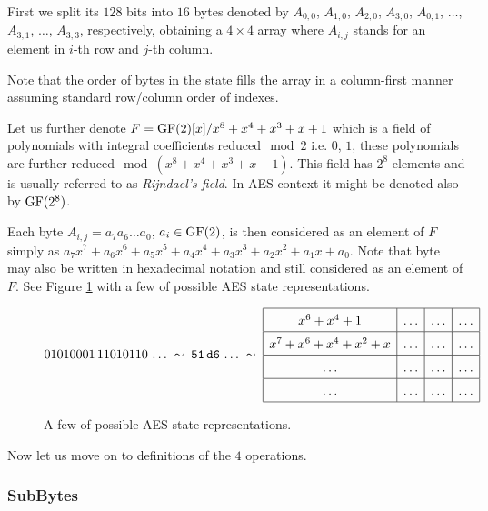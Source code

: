 First we split its $128$ bits into $16$ bytes denoted by $A_{0,0}$, $A_{1,0}$, $A_{2,0}$, $A_{3,0}$, $A_{0,1}$, $\ldots$, $A_{3,1}$, $\ldots$, $A_{3,3}$, respectively, obtaining a $4\times 4$ array where $A_{i,j}$ stands for an element in $i$-th row and $j$-th column.

\begin{remark}
\label{rem:aesstate}
	Note that the order of bytes in the state fills the array in a column-first manner assuming standard row/column order of indexes.
\end{remark}

Let us further denote $F = \mathrm{GF}(2)[x]/x^8+x^4+x^3+x+1$ which is a field of polynomials with integral coefficients reduced$\mod 2$ i.e. $0$, $1$, these polynomials are further reduced$\mod(x^8+x^4+x^3+x+1)$. This field has $2^8$ elements and is usually referred to as {\em Rijndael's field}. In AES context it might be denoted also by $\mathrm{GF}(2^8)$.


Each byte $A_{i,j} = a_7a_6\ldots a_0$, $a_i\in\mathrm{GF}(2)$, is then considered as an element of $F$ simply as $a_7x^7 + a_6x^6 + a_5x^5 + a_4x^4 + a_3x^3 + a_2x^2 + a_1x + a_0$.  Note that byte may also be written in hexadecimal notation and still considered as an element of $F$. See Figure \ref{fig:aesnot} with a few of possible AES state representations.

\begin{figure}[H]
\[
\arraycolsep=.5em\def\arraystretch{1.5}
	01010001\,11010110\,\ldots\;\sim\;\texttt{51}\,\texttt{d6}\,\ldots\;\sim\;
	\begin{array}{|c|c|c|c|}
		\hline
		x^6 + x^4 + 1 & \ldots & \ldots & \ldots \\
		\hline
		x^7 + x^6 + x^4 + x^2 + x & \ldots & \ldots & \ldots \\
		\hline
		\ldots & \ldots & \ldots & \ldots \\
		\hline
		\ldots & \ldots & \ldots & \ldots \\
		\hline
	\end{array}
\]
\caption{A few of possible AES state representations.}
\label{fig:aesnot}
\end{figure}

\noindent
Now let us move on to definitions of the $4$ operations.

\subsubsection{SubBytes}
	
